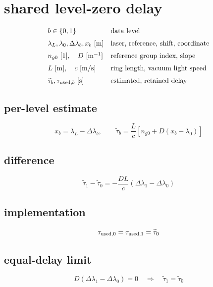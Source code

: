 \section*{shared level-zero delay}
\[
\begin{array}{ll}b\in\{0,1\}&\text{data level}\\[0.6em]\lambda_L,\lambda_0,\Delta\lambda_b,x_b\ [\mathrm m]&\text{laser, reference, shift, coordinate}\\[0.6em]n_{g0}\ [1],\quad D\ [\mathrm{m^{-1}}]&\text{reference group index, slope}\\[0.6em]L\ [\mathrm m],\quad c\ [\mathrm{m/s}]&\text{ring length, vacuum light speed}\\[0.6em]\widetilde\tau_b,\tau_{{\rm used},b}\ [\mathrm s]&\text{estimated, retained delay}\end{array}
\]
\subsection*{per-level estimate}
\[
\displaystyle x_b=\lambda_L-\Delta\lambda_b,\qquad\widetilde\tau_b=\frac{L}{c}[n_{g0}+D(x_b-\lambda_0)]
\]
\subsection*{difference}
\[
\displaystyle \widetilde\tau_1-\widetilde\tau_0=-\frac{DL}{c}(\Delta\lambda_1-\Delta\lambda_0)
\]
\subsection*{implementation}
\[
\displaystyle \tau_{{\rm used},0}=\tau_{{\rm used},1}=\widetilde\tau_0
\]
\subsection*{equal-delay limit}
\[
\displaystyle D(\Delta\lambda_1-\Delta\lambda_0)=0\quad\Longrightarrow\quad\widetilde\tau_1=\widetilde\tau_0
\]
